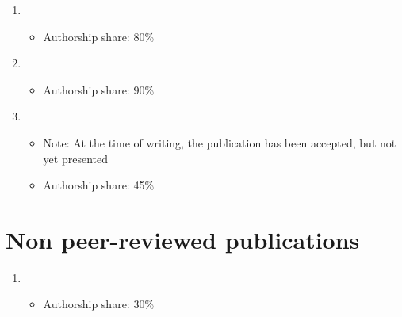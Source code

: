 \begin{enumerate}[resume]
	\item{}
		\begin{itemize}
			\item Authorship share: 80\%
		\end{itemize}
	\item{}
		\begin{itemize}
			\item Authorship share: 90\%
		\end{itemize}
	\item{}
		\begin{itemize}
			\item Note: At the time of writing, the publication has been accepted, but not yet presented
			\item Authorship share: 45\%
		\end{itemize}
\end{enumerate}

\section*{Non peer-reviewed publications}

\begin{enumerate}[resume]
	\item{}
		\begin{itemize}
			\item Authorship share: 30\%
		\end{itemize}
\end{enumerate}
